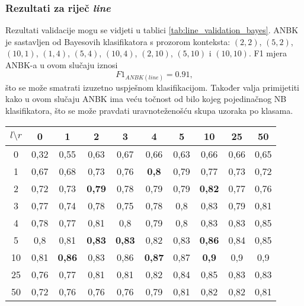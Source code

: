 \documentclass[10pt, a4paper]{article}
\begin{document}
\subsubsection{Rezultati za riječ \emph{line}} 
Rezultati validacije mogu se vidjeti u tablici \ref{tab:line_validation_bayes}.
ANBK je sastavljen od Bayesovih klasifikatora s prozorom konteksta: $(2,2)$,
$(5,2)$, $(10,1)$, $(1,4)$, $(5,4)$, $(10,4)$, $(2,10)$, $(5,10)$ i $(10,10)$.
F1 mjera ANBK-a u ovom slučaju iznosi
\begin{equation}
\label{eq:F1_ansambl_line}
F1_{ANBK(line)} = 0.91,
\end{equation}
što se može smatrati izuzetno uspješnom klasifikacijom. 
Također valja primijetiti kako u ovom slučaju ANBK ima veću točnost
od bilo kojeg pojedinačnog NB klasifikatora, što
se može pravdati uravnoteženošću skupa uzoraka po klasama.
\begin{table*}[!hbtp]
\caption{F1 mjere Bayesovih klasifikatora dobivene validacijom za riječ \emph{line}}
\label{tab:line_validation_bayes}
\begin{center}
\begin{tabular}{|c|ccccccccc|}
\hline
$l \setminus r$ & 0 & 1 & 2 & 3 & 4 & 5 & 10 & 25 & 50 \\
\hline
0  & 0,32  & 0,55  & 0,63  & 0,67  & 0,66  & 0,63  & 0,66  & 0,66  & 0,65 \\  
1  & 0,67  & 0,68  & 0,73  & 0,76  & \textbf{0,8}   & 0,79  & 0,77  & 0,73  & 0,72 \\ 
2  & 0,72  & 0,73  & \textbf{0,79}  & 0,78  & 0,79  & 0,79  & \textbf{0,82}  & 0,77  & 0,76 \\ 
3  &  0,77  & 0,74  & 0,78  & 0,75  & 0,78  & 0,8   & 0,83  & 0,79  & 0,81 \\ 
4  & 0,78  & 0,77  & 0,81  & 0,8   & 0,79  & 0,8   & 0,83  & 0,83  & 0,85 \\ 
5  & 0,8   & 0,81  & \textbf{0,83}  & \textbf{0,83}  & 0,82  & 0,83  & \textbf{0,86}  & 0,84  & 0,85 \\ 
10 & 0,81  & \textbf{0,86}  & 0,83  & 0,86  & \textbf{0,87}  & 0,87  & \textbf{0,9}   & 0,9   & 0,9  \\
25 & 0,76  & 0,77  & 0,81  & 0,81  & 0,82  & 0,84  & 0,85  & 0,83  & 0,83 \\ 
50 & 0,72  & 0,76  & 0,76  & 0,76  & 0,79  & 0,81  & 0,82  & 0,82  & 0,81 \\ 
\hline
\end{tabular}
\end{center}
\end{table*}
\end{document}

